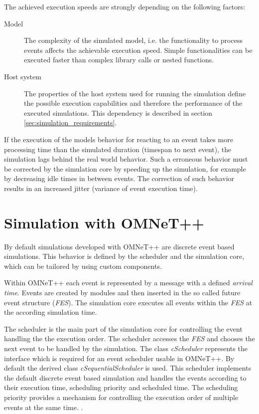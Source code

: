 The achieved execution speeds are strongly depending on the following factors:
\begin{description}
    \item[Model] The complexity of the simulated model, i.e. the functionality to process events affects the achievable execution speed.
                 Simple functionalities can be executed faster than complex library calls or nested functions.
    \item[Host system] The properties of the host system used for running the simulation define the possible execution capabilities and therefore the performance of the executed simulations.
                       This dependency is described in section \ref{sec:simulation_requirements}.
\end{description}

If the execution of the models behavior for reacting to an event takes more processing time than the simulated duration (timespan to next event), the simulation lags behind the real world behavior.
Such a erroneous behavior must be corrected by the simulation core by speeding up the simulation, for example by decreasing idle times in between events.
The correction of such behavior results in an increased jitter (variance of event execution time).
 \cite[section III.B]{belanger_what_2010}


\section{Simulation with OMNeT++}
\label{sec:simulation_omnet}
By default simulations developed with OMNeT++ are discrete event based simulations.
This behavior is defined by the scheduler and the simulation core, which can be tailored by using custom components. \cite[section 4.1]{omnet_manual}

Within OMNeT++ each event is represented by a message with a defined \emph{arrival time}.
Events are created by modules and then inserted in the so called future event structure (\emph{FES}).
The simulation core executes all events within the \emph{FES} at the according simulation time.

The scheduler is the main part of the simulation core for controlling the event handling the the execution order.
The scheduler accesses the \emph{FES} and chooses the next event to be handled by the simulation.
The class \emph{cScheduler} represents the interface which is required for an event scheduler usable in OMNeT++.
By default the derived class \emph{cSequentialScheduler} is used.
This scheduler implements the default discrete event based simulation and handles the events according to their execution time, scheduling priority and scheduled time.
The scheduling priority provides a mechanism for controlling the execution order of multiple events at the same time. \cite[section 4.1]{omnet_manual}.

